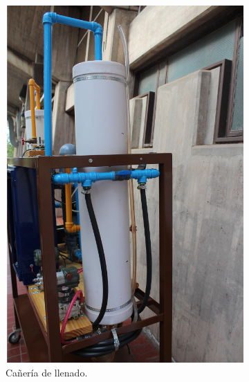 \begin{figure}[t]
        \centering
        \begin{subfigure}[b]{0.40\textwidth}
\includegraphics[width=\textwidth]
	{Cap2-DisenoEnsamblado/images/caneria1.JPG}
	\caption{Cañería de llenado.}
        \end{subfigure}%
        \hfill
        \begin{subfigure}[b]{0.40\textwidth}

\end{subfigure}
\end{figure}
